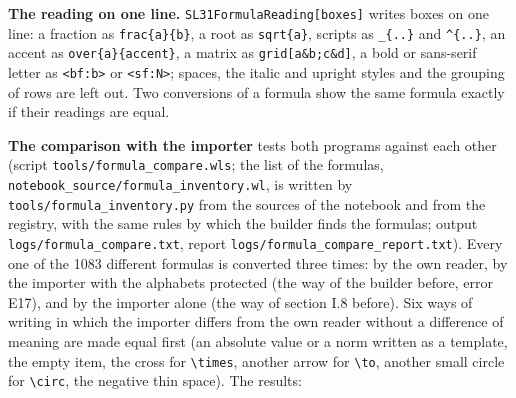 \documentclass[
  10pt,
]{article}
\begin{document}
\textbf{The reading on one line.} \texttt{SL31FormulaReading{[}boxes{]}}
writes boxes on one line: a fraction as \texttt{frac\{a\}\{b\}}, a root
as \texttt{sqrt\{a\}}, scripts as \texttt{\_\{..\}} and
\texttt{\^{}\{..\}}, an accent as \texttt{over\{a\}\{accent\}}, a matrix
as \texttt{grid{[}a\&b;c\&d{]}}, a bold or sans-serif letter as
\texttt{\textless{}bf:b\textgreater{}} or
\texttt{\textless{}sf:N\textgreater{}}; spaces, the italic and upright
styles and the grouping of rows are left out. Two conversions of a
formula show the same formula exactly if their readings are equal.

\textbf{The comparison with the importer} tests both programs against
each other (script \texttt{tools/formula\_compare.wls}; the list of the
formulas, \texttt{notebook\_source/formula\_inventory.wl}, is written by
\texttt{tools/formula\_inventory.py} from the sources of the notebook
and from the registry, with the same rules by which the builder finds
the formulas; output \texttt{logs/formula\_compare.txt}, report
\texttt{logs/formula\_compare\_report.txt}). Every one of the 1083
different formulas is converted three times: by the own reader, by the
importer with the alphabets protected (the way of the builder before,
error E17), and by the importer alone (the way of section I.8 before).
Six ways of writing in which the importer differs from the own reader
without a difference of meaning are made equal first (an absolute value
or a norm written as a template, the empty item, the cross for
\texttt{\textbackslash{}times}, another arrow for
\texttt{\textbackslash{}to}, another small circle for
\texttt{\textbackslash{}circ}, the negative thin space). The results:
\end{document}

